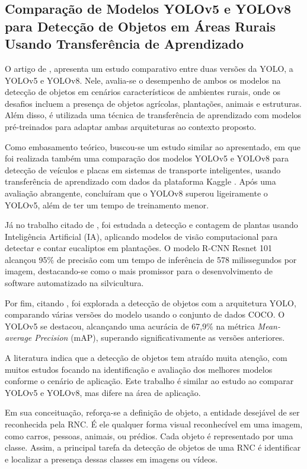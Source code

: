 \subsection{Comparação de Modelos YOLOv5 e YOLOv8 para Detecção de Objetos em Áreas Rurais Usando Transferência de Aprendizado}

O artigo de , apresenta um estudo comparativo entre duas versões da YOLO, a YOLOv5 e YOLOv8. Nele, avalia-se o desempenho de ambos os modelos na detecção de objetos em cenários característicos de ambientes rurais, onde os desafios incluem a presença de objetos agrícolas, plantações, animais e estruturas. Além disso, é utilizada uma técnica de transferência de aprendizado com modelos pré-treinados para adaptar ambas arquiteturas ao contexto proposto.

Como embasamento teórico, buscou-se um estudo similar ao apresentado, em que foi realizada também uma comparação dos modelos YOLOv5 e YOLOv8 para detecção de veículos e placas em sistemas de transporte inteligentes, usando transferência de aprendizado com dados da plataforma Kaggle \cite{afonso2023vehicle}. Após uma avaliação abrangente, concluíram que o YOLOv8 superou ligeiramente o YOLOv5, além de ter um tempo de treinamento menor.

Já no trabalho citado de , foi estudada a detecção e contagem de plantas usando Inteligência Artificial (IA), aplicando modelos de visão computacional para detectar e contar eucaliptos em plantações. O modelo R-CNN Resnet 101 alcançou 95\% de precisão com um tempo de inferência de 578 milissegundos por imagem, destacando-se como o mais promissor para o desenvolvimento de software automatizado na silvicultura.

Por fim, citando , foi explorada a detecção de objetos com a arquitetura YOLO, comparando várias versões do modelo usando o conjunto de dados COCO. O YOLOv5 se destacou, alcançando uma acurácia de 67,9\% na métrica \textit{Mean-average Precision} (mAP), superando significativamente as versões anteriores.

A literatura indica que a detecção de objetos tem atraído muita atenção, com muitos estudos focando na identificação e avaliação dos melhores modelos conforme o cenário de aplicação. Este trabalho é similar ao estudo  ao comparar YOLOv5 e YOLOv8, mas difere na área de aplicação.

Em sua conceituação, reforça-se a definição de objeto, a entidade desejável de ser reconhecida pela RNC. É ele qualquer forma visual reconhecível em uma imagem, como carros, pessoas, animais, ou prédios. Cada objeto é representado por uma classe. Assim, a principal tarefa da detecção de objetos de uma RNC é identificar e localizar a presença dessas classes em imagens ou vídeos.

